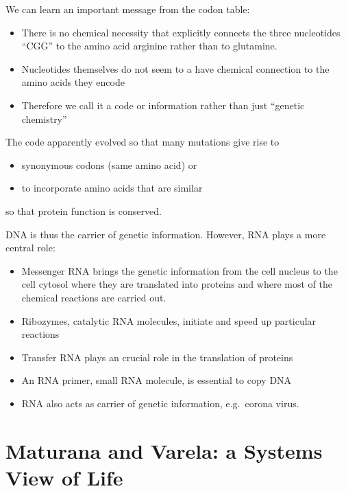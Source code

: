 \documentclass[
  11pt,
]{book}
\providecommand{\tightlist}{%
  \setlength{\itemsep}{0pt}\setlength{\parskip}{0pt}}
\begin{document}
We can learn an important message from the codon table:

\begin{itemize}
\item
  There is no chemical necessity that explicitly connects the three nucleotides ``CGG'' to the amino acid arginine rather than to glutamine.
\item
  Nucleotides themselves do not seem to a have chemical connection to the amino acids they encode
\item
  Therefore we call it a code or information rather than just ``genetic chemistry''
\end{itemize}

The code apparently evolved so that many mutations give rise to

\begin{itemize}
\tightlist
\item
  synonymous codons (same amino acid) or
\item
  to incorporate amino acids that are similar
\end{itemize}

so that protein function is conserved.

DNA is thus the carrier of genetic information. However, RNA plays a more central role:

\begin{itemize}
\tightlist
\item
  Messenger RNA brings the genetic information from the cell nucleus to the cell cytosol where they are translated into proteins and where most of the chemical reactions are carried out.
\item
  Ribozymes, catalytic RNA molecules, initiate and speed up particular reactions
\item
  Transfer RNA plays an crucial role in the translation of proteins
\item
  An RNA primer, small RNA molecule, is essential to copy DNA\\
\item
  RNA also acts as carrier of genetic information, e.g.~corona virus.
\end{itemize}

\hypertarget{maturana-and-varela-a-systems-view-of-life}{%
\section{Maturana and Varela: a Systems View of Life}\label{maturana-and-varela-a-systems-view-of-life}}
\end{document}
